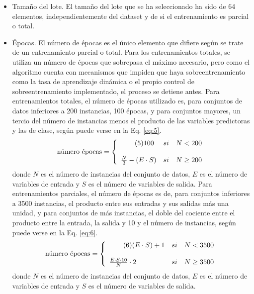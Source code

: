 \documentclass[spanish,a4paper,12pt,twoside]{report}
\begin{document}
  \begin{itemize}
    \item Tamaño del lote. El tamaño del lote que se ha seleccionado ha sido de 64 elementos, independientemente del dataset y de si el entrenamiento es parcial o total.
    \item Épocas. El número de épocas es el único elemento que difiere según se trate de un entrenamiento parcial o total. Para los entrenamientos totales, se utiliza un número de épocas que sobrepasa el máximo necesario, pero como el algoritmo cuenta con mecanismos que impiden que haya sobreentrenamiento como la tasa de aprendizaje dinámica o el propio control de sobreentrenamiento implementado, el proceso se detiene antes. Para entrenamientos totales, el número de épocas utilizado es, para conjuntos de datos inferiores a 200 instancias, 100 épocas, y para conjuntos mayores, un tercio del número de instancias menos el producto de las variables predictoras y las de clase, según puede verse en la Eq. \ref{eq:5}.
    \begin{align*}
      \textnormal{número épocas} = \left\{ \begin{array}{lcc} \label{eq:5}\tag{5}
             100 &   si  & N < 200 \\
             \\ \frac{N}{3} - (E \cdot S) &  si & N \geq 200
             \end{array}
      \right.
    \end{align*}
    donde $N$ es el número de instancias del conjunto de datos, $E$ es el número de variables de entrada y $S$ es el número de variables de salida. Para entrenamientos parciales, el número de épocas es de, para conjuntos inferiores a 3500 instancias, el producto entre sus entradas y sus salidas más una unidad, y para conjuntos de más instancias, el doble del cociente entre el producto entre la entrada, la salida y 10 y el número de instancias, según puede verse en la Eq. \ref{eq:6}.
    \begin{align*}
      \textnormal{número épocas} = \left\{ \begin{array}{lcc} \label{eq:6}\tag{6}
             (E \cdot S) + 1 &   si  & N < 3500 \\
             \\ \frac{E \cdot S \cdot 10}{N} \cdot 2 &  si & N \geq 3500
             \end{array}
      \right.
    \end{align*}
    donde $N$ es el número de instancias del conjunto de datos, $E$ es el número de variables de entrada y $S$ es el número de variables de salida.

\end{itemize}
\end{document}
